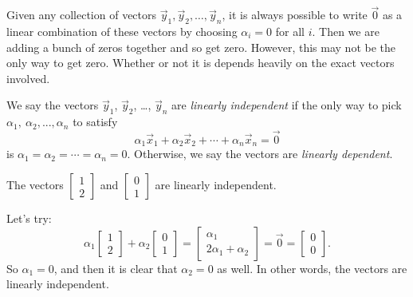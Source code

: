 Given any collection of vectors $\vec{y}_1, \vec{y}_2, \ldots, \vec{y}_n$, it is always possible to write $\vec{0}$ as a linear combination of these vectors by choosing $\alpha_i = 0$ for all $i$. Then we are adding a bunch of zeros together and so get zero. However, this may not be the only way to get zero. Whether or not it is depends heavily on the exact vectors involved.

\begin{definition}
We say the vectors $\vec{y}_1$, $\vec{y}_2$, \ldots, $\vec{y}_n$ are
\emph{linearly independent} if the only way to pick $\alpha_1,\ \alpha_2, ..., \alpha_n$ to satisfy
\begin{equation*}
\alpha_1 \vec{x}_1 + 
\alpha_2 \vec{x}_2 + 
\cdots +
\alpha_n \vec{x}_n 
=
\vec{0}
\end{equation*}
is $\alpha_1 = \alpha_2 = \cdots = \alpha_n = 0$.
Otherwise, we say the vectors are \emph{linearly dependent}.
\end{definition}

\begin{example} The vectors
$\left[ \begin{smallmatrix} 1 \\ 2 \end{smallmatrix} \right]$
and
$\left[ \begin{smallmatrix} 0 \\ 1 \end{smallmatrix} \right]$
are linearly independent.
\end{example}

\begin{exampleSol}
Let's try:
\begin{equation*}
\alpha_1
\begin{bmatrix} 1 \\ 2 \end{bmatrix}
+
\alpha_2
\begin{bmatrix} 0 \\ 1 \end{bmatrix}
=
\begin{bmatrix} \alpha_1 \\ 2 \alpha_1 + \alpha_2 \end{bmatrix}
=
\vec{0} =
\begin{bmatrix} 0 \\ 0 \end{bmatrix} .
\end{equation*}
So $\alpha_1 = 0$, and then it is clear that $\alpha_2 = 0$ as well.  In
other words, the vectors are linearly independent.
\end{exampleSol}

